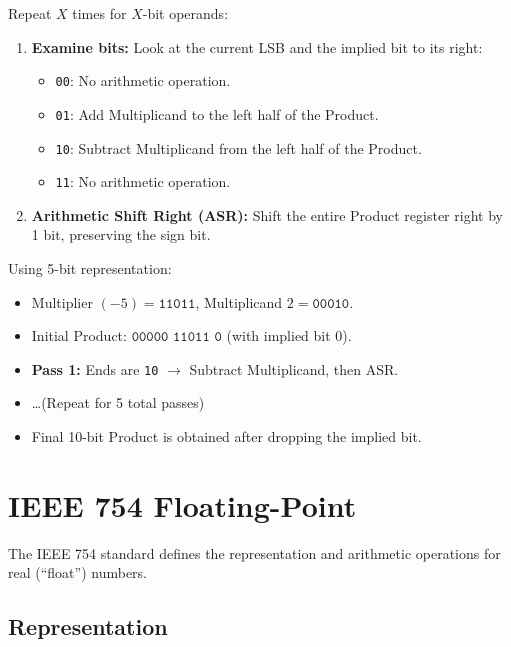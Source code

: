 \begin{proposition}
Repeat $X$ times for $X$-bit operands:
\begin{enumerate}
    \item \textbf{Examine bits:} Look at the current LSB and the implied bit to its right:
    \begin{itemize}
        \item \texttt{00}: No arithmetic operation.
        \item \texttt{01}: Add Multiplicand to the left half of the Product.
        \item \texttt{10}: Subtract Multiplicand from the left half of the Product.
        \item \texttt{11}: No arithmetic operation.
    \end{itemize}
    \item \textbf{Arithmetic Shift Right (ASR):} Shift the entire Product register right by 1 bit, preserving the sign bit.
\end{enumerate}
\end{proposition}

\begin{example}
Using 5-bit representation:
\begin{itemize}
    \item Multiplier $(-5) = \texttt{11011}$, Multiplicand $2 = \texttt{00010}$.
    \item Initial Product: $\texttt{00000 11011 0}$ (with implied bit 0).
    \item \textbf{Pass 1:} Ends are \texttt{10} $\rightarrow$ Subtract Multiplicand, then ASR.
    \item \dots (Repeat for 5 total passes)
    \item Final 10-bit Product is obtained after dropping the implied bit.
\end{itemize}
\end{example}

\section{IEEE 754 Floating-Point}

The IEEE 754 standard defines the representation and arithmetic operations for real (``float'') numbers.

\subsection{Representation}

